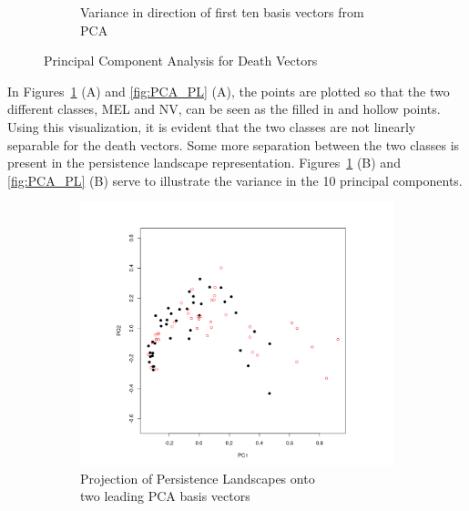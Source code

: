 \documentclass[11pt, reqno]{amsart}
\theoremstyle{plain}
\theoremstyle{definition}
\begin{document}
\begin{figure}[H]
\begin{subfigure}{.5\textwidth}
  \caption{Variance in direction of first ten basis vectors from PCA}
\end{subfigure}
\caption{Principal Component Analysis for Death Vectors}
\label{fig:PCA_DV}
\end{figure}
In Figures~\ref{fig:PCA_DV} (A) and \ref{fig:PCA_PL} (A), the points are plotted so that the two different classes, MEL and NV, can be seen as the filled in and hollow points. Using this visualization, it is evident that the two classes are not linearly separable for the death vectors. Some more separation between the two classes is present in the persistence landscape representation. Figures~\ref{fig:PCA_DV} (B) and \ref{fig:PCA_PL} (B) serve to illustrate the variance in the 10 principal components.
\begin{figure}
\centering
\begin{subfigure}{.5\textwidth}
  \centering
  \includegraphics[width=\linewidth]{nv_mel_PL_PCA_Points_Plot.png}
  \caption{Projection of Persistence Landscapes onto\\two leading PCA basis vectors}
\end{subfigure}%
\begin{subfigure}{.5\textwidth}
  \centering

\end{subfigure}
\end{figure}
\end{document}
